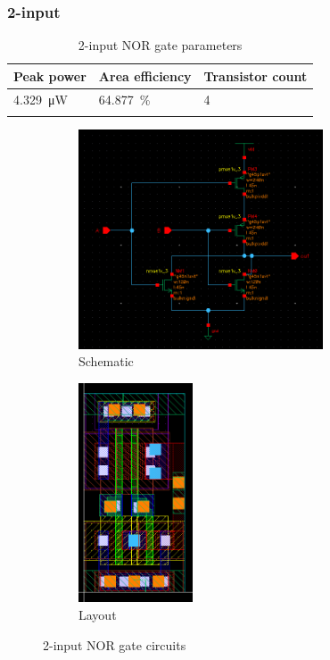 \subsubsection{2-input}
    \begin{xltabular}{\textwidth}{YYY}
        \hline
        Peak power & Area efficiency & Transistor count \\
        \hline
        \qty{4.329}{\uW} & \qty{64.877}{\percent} & 4 \\
        \hline    
        \caption{2-input NOR gate parameters}
    \end{xltabular}
\begin{figure}[H]
    \begin{subfigure}{0.6\textwidth}
        \centering
        \includegraphics[width=\textwidth,height=6.5cm,keepaspectratio]{./figures/nor2/schematic.png}
        \caption{Schematic}\label{fig:nor2schematic}
    \end{subfigure}
    \hfill
    \begin{subfigure}{0.4\textwidth}
        \centering
        \includegraphics[width=\textwidth,height=6.5cm,keepaspectratio]{./figures/nor2/layout.png}
        \caption{Layout}\label{fig:nor2layout}
    \end{subfigure}
    \caption{2-input NOR gate circuits}
    \end{figure}
    
